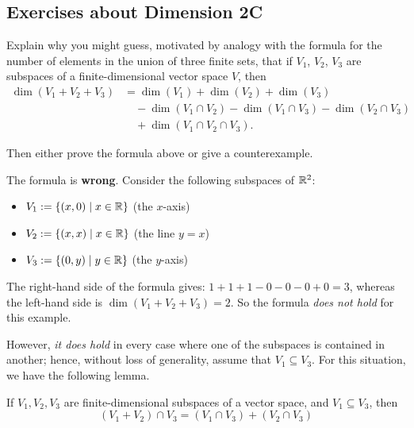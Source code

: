 \subsection*{Exercises about Dimension 2C}

\setcounter{xrcscount}{19}
\begin{xrcs}
  Explain why you might guess, motivated by analogy with the formula for the number of elements in the union of three finite sets, that if $V_1$, $V_2$, $V_3$ are subspaces of a finite-dimensional vector space $V$, then
  \begin{equation}
      \begin{aligned}
      \dim (V_1 + V_2 + V_3) &= \dim (V_1) + \dim (V_2) + \dim (V_3) \\
      & \quad - \dim(V_1 \cap V_2) - \dim (V_1 \cap V_3) - \dim (V_2 \cap V_3) \\
      & \quad + \dim (V_1 \cap V_2 \cap V_3).
    \end{aligned}
  \end{equation}


  Then either prove the formula above or give a counterexample.

  \begin{xsol}
    The formula is \textbf{wrong}. Consider the following subspaces of $\mathbb{R}^2$:
    \begin{itemize}
      \item $V_1 := \{ (x,0) \mid x \in \mathbb{R} \} $ \quad (the $x$-axis)
      \item $V_2 := \{ (x,x) \mid x \in \mathbb{R} \} $ \quad (the line $y=x$)
      \item $V_3 := \{ (0,y) \mid y \in \mathbb{R} \} $ \quad (the $y$-axis)
    \end{itemize}

    The right-hand side of the formula gives: $1+1+1-0-0-0+0 = 3$, whereas the left-hand side is $\dim (V_1 + V_2 + V_3) = 2$. So the formula \emph{does not hold} for this example.

    However, \emph{it does hold}  in every case where one of the subspaces is contained in another; hence, without loss of generality, assume that $V_1 \subseteq V_3$. For this situation, we have the following lemma.

     If $V_1, V_2, V_3$ are finite-dimensional subspaces of a vector space, and $V_1 \subseteq V_3$, then
    \begin{equation}
      \label{eq: lemma}
       (V_1 + V_2) \cap V_3 = (V_1 \cap V_3) + (V_2 \cap V_3)
    \end{equation}


\end{xsol}
\end{xrcs}
